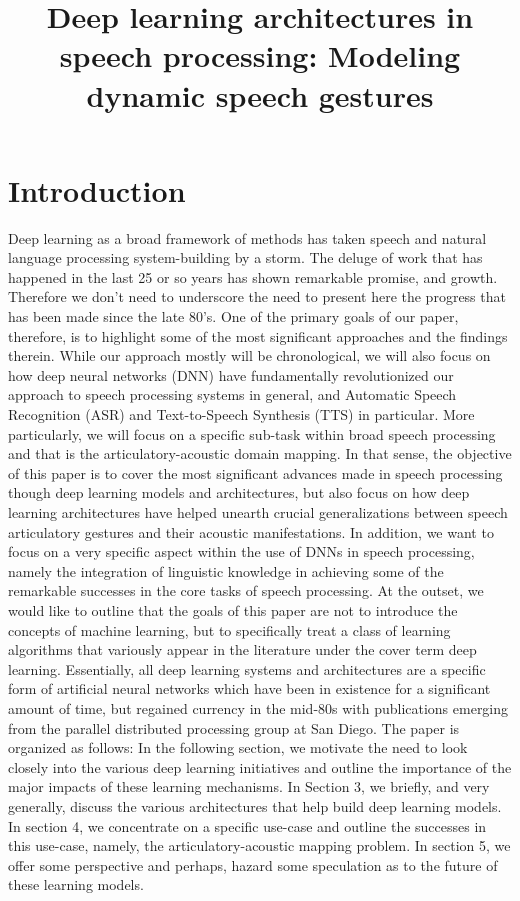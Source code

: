 \documentclass{article}
\author{}\title{Deep learning architectures in speech processing: Modeling dynamic speech gestures}
\begin{document}
\maketitle
\section{Introduction}
Deep learning as a broad framework of methods has taken speech and natural language processing system-building by a storm. The deluge of work that has happened in the last 25 or so years has shown remarkable promise, and growth. Therefore we don't need to underscore the need to present here the progress that has been made since the late 80's. One of the primary goals of our paper, therefore, is to highlight some of the most significant approaches and the findings therein. While our approach mostly will be chronological, we will also focus on how deep neural networks (DNN) have fundamentally revolutionized our approach to speech processing systems in general, and Automatic Speech Recognition (ASR) and Text-to-Speech Synthesis (TTS) in particular. More particularly, we will focus on a specific sub-task within broad speech processing and that is the articulatory-acoustic domain mapping. In that sense, the objective of this paper is to cover the most significant advances made in speech processing though deep learning models and architectures, but also focus on how deep learning architectures have helped unearth crucial generalizations between speech articulatory gestures and their acoustic manifestations. In addition, we want to focus on a very specific aspect within the use of DNNs in speech processing, namely the integration of linguistic knowledge in achieving some of the remarkable successes in the core tasks of speech processing. At the outset, we would like to outline that the goals of this paper are not to introduce the concepts of machine learning, but to specifically treat a class of learning algorithms that variously appear in the literature under the cover term deep learning. Essentially, all deep learning systems and architectures are a specific form of artificial neural networks which have been in existence for a significant amount of time, but regained currency in the mid-80s with publications emerging from the parallel distributed processing group at San Diego. The paper is organized as follows: In the following section, we motivate the need to look closely into the various deep learning initiatives and outline the importance of the major impacts of these learning mechanisms. In Section 3, we briefly, and very generally, discuss the various architectures that help build deep learning models. In section 4, we concentrate on a specific use-case and outline the successes in this use-case, namely, the articulatory-acoustic mapping problem. In section 5, we offer some perspective and perhaps, hazard some speculation as to the future of these learning models. 
\end{document}
